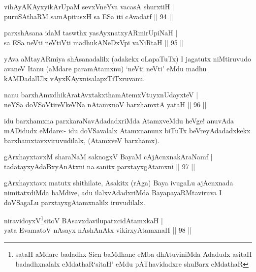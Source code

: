 \begin{shl}
vihAyA\s \s KAyxyikArUpaM sevxVneYva vacasA shurxtiH |\\
puruSAthaRM samApitusxH sa ESa iti cAvadatf \hfill || 94 ||
\end{shl}

\begin{shl}
parxshAsana idaM taswthx yasAyxnatxyARmirUpiNaH |\\
sa ESa neVti neVtiVti madhukANeDxV\s pi vaNiRtaH \hfill || 95 ||
\end{shl}

\begin{artha}
yAva aMtayARmiya shAsanadalilx (adakekx oLapaTuTx) I jagatutx niMtiruvudo avaneV Itanu (aMdare paramAtamxnu) `neVti neVti' eMdu madhu kAMDadalUlx vAyxKAyxnisalapxTiTxruvanu.
\end{artha}

\begin{shl}
nanu barxhAmxdhikAratAvxtakxthamAtemxVtuyxnUdayxteV |\\
neYSa doVSoV\s tireVkeVNa nA\s \s tamxnoV barxhamxtA yataH \hfill || 96 ||
\end{shl}


\begin{artha}%
idu barxhamxna parxkaraNavAdadadxriMda AtamxveMdu heVge! anuvAda mADidudx eMdare:- idu doVSavalalx Atamxnanunx biTuTx beVreyAdadadxkekx barxhamxtavxviruvudilalx, (AtamxveV barxhamx).
\end{artha}


\begin{shl}
gArxhayxtavxM sharaNaM saknogxV BayaM cAjAcnxnakAraNamf |\\
tadatayxyAdaBxyAnAtxni na sanitx parxtayxgAtamxni \hfill || 97 ||
\end{shl}

\begin{artha}
gArxhayxtavx matutx shithilate, Asakitx (rAga) Baya ivugaLu ajAcnxnada nimitatxdiMda baMdive, adu ilalxvAdadxriMda BayapayaRMtaviruva I doVSagaLu parxtayxgAtamxnalilx iruvudilalx.
\end{artha}



\begin{shl}
niravidoyxV\s \footnote{sataH aMdare badadhx Sicn baMdhane eMba dhAtuviniMda Adadudx asitaH badadhxnalalx eMdathaR`sitaH' eMdu pAThavidadxre shuBarx eMdathaR}sitoV BAsavxdavilupatxcidAtamxkaH |\\
yata EvamatoV nAsayx nAshAnAtx vikirxyA\s \s tamxnaH \hfill || 98 ||
\end{shl}

